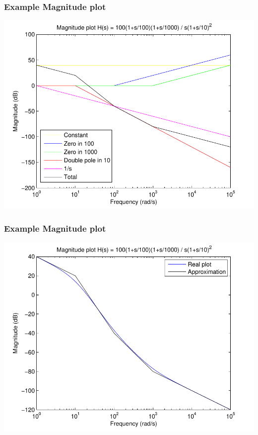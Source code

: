 \begin{frame}
\frametitle{Example Magnitude plot}
\includegraphics[scale=0.5]{MagnitudeParts}

\end{frame}

\begin{frame}
\frametitle{Example Magnitude plot}
\includegraphics[scale=0.5]{MagnitudeApprox}

\end{frame}


